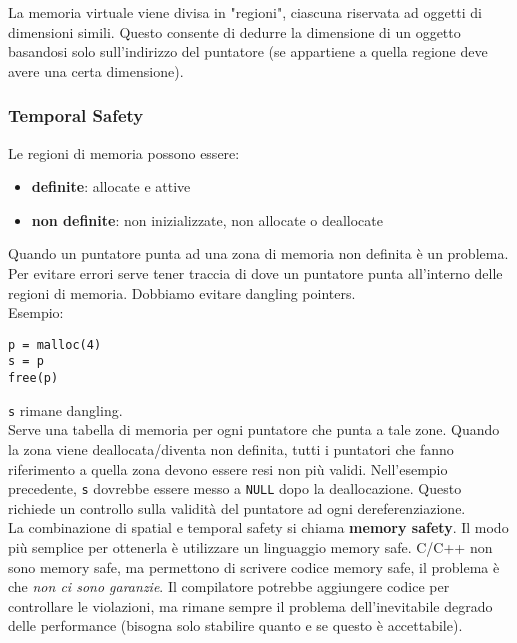 La memoria virtuale viene divisa in "regioni", ciascuna riservata ad oggetti di dimensioni simili. Questo consente di dedurre la dimensione di un oggetto basandosi solo sull'indirizzo del puntatore (se appartiene a quella regione deve avere una certa dimensione).\\


\subsubsection{Temporal Safety}
Le regioni di memoria possono essere: 
\begin{itemize}
	\item \textbf{definite}: allocate e attive
	\item \textbf{non definite}: non inizializzate, non allocate o deallocate
\end{itemize}

Quando un puntatore punta ad una zona di memoria non definita è un problema. Per evitare errori serve tener traccia di dove un puntatore punta all'interno delle regioni di memoria. Dobbiamo evitare dangling pointers.\\
Esempio: 
\begin{verbatim}
p = malloc(4)
s = p
free(p)
\end{verbatim}
\texttt{s} rimane dangling.\\

Serve una tabella di memoria per ogni puntatore che punta a tale zone. Quando la zona viene deallocata/diventa non definita, tutti i puntatori che fanno riferimento a quella zona devono essere resi non più validi. Nell'esempio precedente, \texttt{s} dovrebbe essere messo a \texttt{NULL} dopo la deallocazione. Questo richiede un controllo sulla validità del puntatore ad ogni dereferenziazione.\\

La combinazione di spatial e temporal safety si chiama \textbf{memory safety}. Il modo più semplice per ottenerla è utilizzare un linguaggio memory safe. C/C++ non sono memory safe, ma permettono di scrivere codice memory safe, il problema è che \textit{non ci sono garanzie}. Il compilatore potrebbe aggiungere codice per controllare le violazioni, ma rimane sempre il problema dell'inevitabile degrado delle performance (bisogna solo stabilire quanto e  se questo è accettabile).\\

